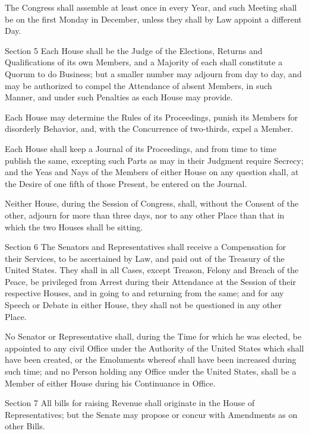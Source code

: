 \documentclass[12pt,a4paper]{article}
\begin{document}
The Congress shall assemble at least once in every Year, and such Meeting shall
be on the first Monday in December, unless they shall by Law appoint a
different Day.

Section 5
Each House shall be the Judge of the Elections, Returns and Qualifications of
its own Members, and a Majority of each shall constitute a Quorum to do
Business; but a smaller number may adjourn from day to day, and may be
authorized to compel the Attendance of absent Members, in such Manner, and
under such Penalties as each House may provide.

Each House may determine the Rules of its Proceedings, punish its Members for
disorderly Behavior, and, with the Concurrence of two-thirds, expel a Member.

Each House shall keep a Journal of its Proceedings, and from time to time
publish the same, excepting such Parts as may in their Judgment require
Secrecy; and the Yeas and Nays of the Members of either House on any question
shall, at the Desire of one fifth of those Present, be entered on the Journal.

Neither House, during the Session of Congress, shall, without the Consent of
the other, adjourn for more than three days, nor to any other Place than that
in which the two Houses shall be sitting.

Section 6
The Senators and Representatives shall receive a Compensation for their
Services, to be ascertained by Law, and paid out of the Treasury of the United
States. They shall in all Cases, except Treason, Felony and Breach of the
Peace, be privileged from Arrest during their Attendance at the Session of
their respective Houses, and in going to and returning from the same; and for
any Speech or Debate in either House, they shall not be questioned in any other
Place.

No Senator or Representative shall, during the Time for which he was elected,
be appointed to any civil Office under the Authority of the United States which
shall have been created, or the Emoluments whereof shall have been increased
during such time; and no Person holding any Office under the United States,
shall be a Member of either House during his Continuance in Office.


Section 7
All bills for raising Revenue shall originate in the House of Representatives;
but the Senate may propose or concur with Amendments as on other Bills.
\end{document}
